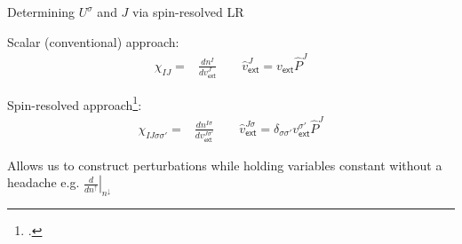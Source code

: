 \documentclass[xcolor=table,aspectratio=169]{beamer}
\numberwithin{equation}{section}
\begin{document}
% 
% 
\begin{frame}{Determining $U^\sigma$ and $J$ via spin-resolved LR}

    Scalar (conventional) approach:
    \begin{align*}
        \chi_{IJ} = & \frac{d n^I}{d v^J_\mathsf{ext}}\qquad \hat v^J_\mathsf{ext} = v_\mathsf{ext} \hat P^J
    \end{align*}

    Spin-resolved approach\footcite{Linscott2018}:
    \begin{align*}
        \chi_{IJ\sigma\sigma'} = & \frac{d n^{I\sigma}}{d v^{J\sigma'}_\mathsf{ext}}\qquad \hat v^{J\sigma}_\mathsf{ext} = \delta_{\sigma \sigma'} v^{\sigma'}_\mathsf{ext} \hat P^J
    \end{align*}

    Allows us to construct perturbations while holding variables constant without a headache e.g. $\left.\frac{d}{dn^\uparrow}\right|_{n^\downarrow}$

\end{frame}
\end{document}
